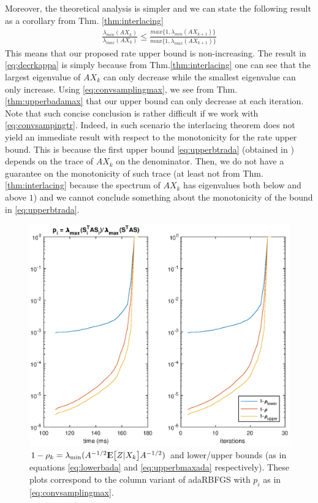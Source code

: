 \documentclass[12pt,conference,compsocconf]{IEEEtran}
\newcommand{\E}{{\rm I\kern-.3em E}}
\begin{document}
Moreover, the theoretical analysis is simpler and we can state the following result as a corollary from Thm. \ref{thm:interlacing}
\begin{align}\label{eq:decrkappa}
	\frac{\lambda_{min}(AX_k)}{\lambda_{max}(AX_k)} \leq \frac{max\{1,\lambda_{min}(AX_{k+1})\}}{max\{1,\lambda_{max}(AX_{k+1})\}}
\end{align}
This means that our proposed rate upper bound is non-increasing. The result in \ref{eq:decrkappa} is simply because from Thm.\ref{thm:interlacing} one can see that the largest eigenvalue of $AX_k$ can only decrease while the smallest eigenvalue can only increase. Using \ref{eq:convsamplingmax}, we see from Thm. \ref{thm:upperbadamax} that our upper bound can only decrease at each iteration. Note that such concise conclusion is rather difficult if we work with \ref{eq:convsampingtr}. Indeed, in such scenario the interlacing theorem does not yield an immediate result with respect to the monotonicity for the rate upper bound. This is because the first upper bound \ref{eq:upperbtrada} (obtained in \cite{Gower1}) depends on the trace of $AX_k$ on the denominator. Then, we do not have a guarantee on the monotonicity of such trace (at least not from Thm. \ref{thm:interlacing} because the spectrum of $AX_k$ has eigenvalues both below and above $1$) and we cannot conclude something about the monotonicity of the bound in \ref{eq:upperbtrada}.\\
\begin{figure}[H]
  \centering
  \includegraphics[height=0.7\columnwidth,width=1.1\columnwidth]{ratemax.eps}
  
  \vspace{-2mm}
  \caption{$1-\rho_k=\lambda_{\text{min}}(A^{-1/2}\E\big[Z|X_k\big]A^{-1/2})$ and lower/upper bounds (as in equations \ref{eq:lowerbada} and \ref{eq:upperbmaxada} respectively). These plots correspond to the column variant of adaRBFGS with $p_i$ as in \ref{eq:convsamplingmax}. \label{fig:ratemax}}  
  
\end{figure}
\end{document}
